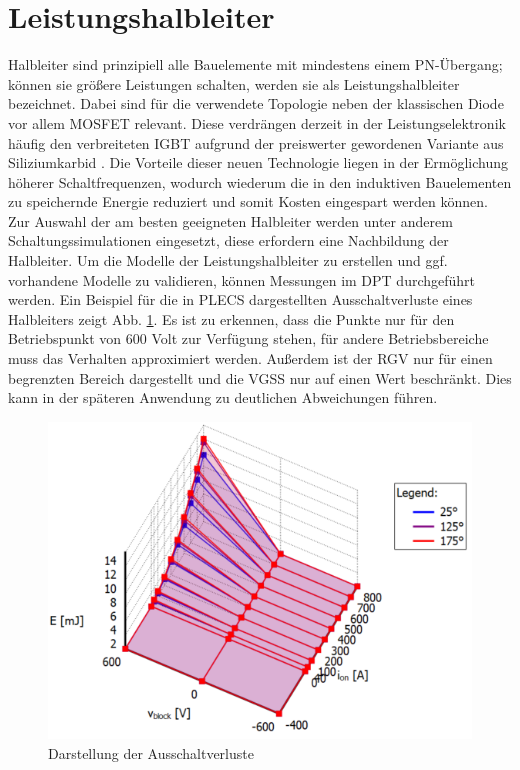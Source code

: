 \section{Leistungshalbleiter}
	Halbleiter sind prinzipiell alle Bauelemente mit mindestens einem PN-Übergang; können sie größere Leistungen schalten, werden sie als Leistungshalbleiter bezeichnet. Dabei sind für die verwendete Topologie neben der klassischen Diode vor allem \gls{MOSFET} relevant. Diese verdrängen derzeit in der Leistungselektronik häufig den verbreiteten IGBT aufgrund der preiswerter gewordenen Variante aus Siliziumkarbid \cite{SiCTrend}. Die Vorteile dieser neuen Technologie liegen in der Ermöglichung höherer Schaltfrequenzen, wodurch wiederum die in den induktiven Bauelementen zu speichernde Energie reduziert und somit Kosten eingespart werden können.\\
	Zur Auswahl der am besten geeigneten Halbleiter werden unter anderem Schaltungssimulationen eingesetzt, diese erfordern eine Nachbildung der Halbleiter. Um die Modelle der Leistungshalbleiter zu erstellen und ggf. vorhandene Modelle zu validieren, können Messungen im \gls{DPT} durchgeführt werden. Ein Beispiel für die in \gls{PLECS} dargestellten Ausschaltverluste eines Halbleiters zeigt Abb. \ref{fig:plecsff2thermalmodel}. Es ist zu erkennen, dass die Punkte nur für den Betriebspunkt von 600 Volt zur Verfügung stehen, für andere Betriebsbereiche muss das Verhalten approximiert werden. Außerdem ist der \gls{RGV} nur für einen begrenzten Bereich dargestellt und die \gls{VGSS} nur auf einen Wert beschränkt. Dies kann in der späteren Anwendung zu deutlichen Abweichungen führen.
	\begin{figure}
		\centering
		\includegraphics[width=0.7\linewidth]{content/Grafiken/PLECS_FF2ThermalModel}
		\caption[Darstellung der Ausschaltverluste \cite{IFAGFF2}]{Darstellung der Ausschaltverluste \cite{IFAGFF2}}
		\label{fig:plecsff2thermalmodel}
	\end{figure}

